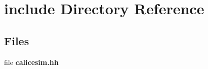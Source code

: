 \section{include Directory Reference}
\label{dir_8e37431cba39aacf34cea24b78c1486e}
\subsection*{Files}
\begin{DoxyCompactItemize}
\item 
file {\bfseries calicesim.\-hh}
\end{DoxyCompactItemize}
